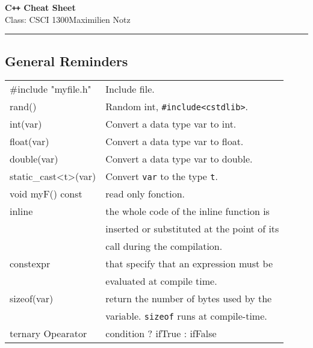 \documentclass[5pt]{article}
\begin{document}
\begin{center}
     \Large{\textbf{C\texttt{++} Cheat Sheet}}\\
     \small{Class: CSCI 1300}\hfill\small{\textcopyright Maximilien Notz \the\year{}}
     \noindent\rule{20cm}{0.4pt}
\end{center}
\begin{multicols}{2}
\setcounter{secnumdepth}{0}


\subsection{General Reminders}
\begin{tabular}{>{\ttfamily}l l}

\#include "myfile.h"    & Include file.\\
rand()                  & Random int, \texttt{\#include<cstdlib>}.\\
int(var)                & Convert a data type var to int.\\
float(var)              & Convert a data type var to float.\\
double(var)             & Convert a data type var to double.\\
static\_cast<t>(var)    & Convert \texttt{var} to the type \texttt{t}.\\
void myF() const        & read only fonction.\\
inline                  & the whole code of the inline function is\\
                        & inserted or substituted at the point of its\\
                        & call during the compilation.\\
constexpr               & that specify that an expression must be\\
                        & evaluated at compile time.\\
sizeof(var)             & return the number of bytes used by the\\
                        & variable. \texttt{sizeof} runs at compile-time.\\
ternary Opearator       & condition ? ifTrue : ifFalse\\
\end{tabular}



\end{multicols}
\end{document}

